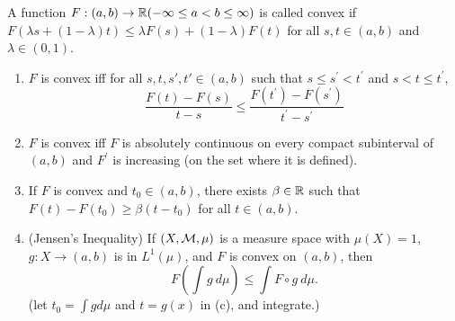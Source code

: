 \documentclass[12pt,a4paper]{article}
\begin{document}
\begin{problem}\label{prob:3-42}
A function $F:(a,b)\rightarrow\mathbb{R}(-\infty\le a<b\le\infty)$ is called convex if $F(\lambda s+(1-\lambda)t)\le\lambda F(s)+(1-\lambda)F(t)$ for all $s, t\in(a,b)$ and $\lambda\in(0,1)$.
\begin{enumerate}[label=\alph*.]
    \item $F$ is convex iff for all $s, t, s', t' \in (a, b)$ such that $s\le s^{\prime}<t^{\prime}$ and $s<t\le t^{\prime}$,
    \[\frac{F(t)-F(s)}{t-s}\le\frac{F(t^{\prime})-F(s^{\prime})}{t^{\prime}-s^{\prime}}\]
    \item $F$ is convex iff $F$ is absolutely continuous on every compact subinterval of $(a, b)$ and $F^{\prime}$ is increasing (on the set where it is defined).
    \item If $F$ is convex and $t_{0}\in(a,b)$, there exists $\beta\in\mathbb{R}$ such that $F(t)-F(t_{0})\ge \beta(t-t_{0})$ for all $t\in(a,b)$.
    \item (Jensen's Inequality) If $(X, \mathcal{M}, \mu)$ is a measure space with $\mu(X)=1$, $g:X\rightarrow(a,b)$ is in $L^{1}(\mu)$, and $F$ is convex on $(a, b)$, then
    \[F\left(\int g~d\mu\right)\le\int F\circ g~d\mu.\]
    (let $t_0=\int gd\mu$ and $t=g(x)$ in (c), and integrate.)
\end{enumerate}
\end{problem}
\end{document}
